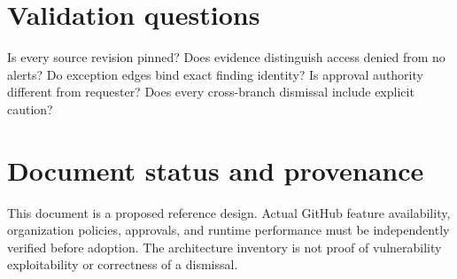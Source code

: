 \documentclass[11pt,letterpaper]{article}
\begin{document}
\section{Validation questions}
Is every source revision pinned? Does evidence distinguish access denied from no alerts? Do exception edges bind exact finding identity? Is approval authority different from requester? Does every cross-branch dismissal include explicit caution?


\section*{Document status and provenance}
This document is a proposed reference design. Actual GitHub feature availability, organization policies, approvals, and runtime performance must be independently verified before adoption. The architecture inventory is not proof of vulnerability exploitability or correctness of a dismissal.
\end{document}

